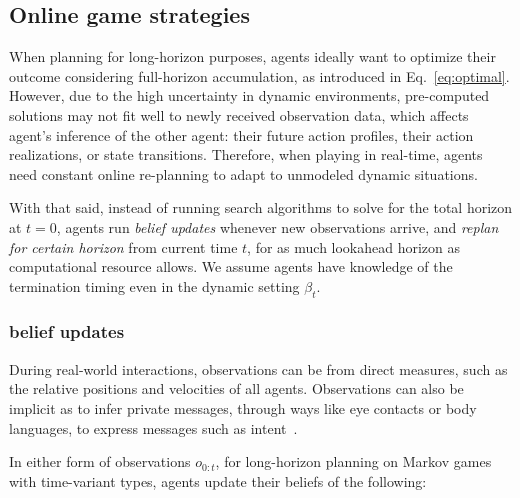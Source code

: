 \documentclass[letterpaper, 10 pt, conference]{ieeeconf}  %
\newcommand{\argmax}{\arg\!\!\max}
\begin{document}
\subsection{Online game strategies}
\vspace{-.2em}
When planning for long-horizon purposes, agents ideally 
want to optimize their outcome considering full-horizon accumulation, as introduced in 
Eq.~\ref{eq:optimal}. However, due to the high uncertainty in dynamic 
environments, pre-computed solutions may not fit well to newly received 
observation data, which affects agent's inference of the other 
agent: their future action profiles, their action realizations, or state transitions. Therefore, when 
playing in real-time, agents need constant online re-planning to adapt 
to unmodeled dynamic situations. 

With that said, instead of running search algorithms to solve for the total 
horizon at $t=0$, agents run \textit{belief updates} whenever new 
observations arrive, and 
\textit{replan for certain horizon} from current time $t$, for as much 
lookahead horizon as computational resource allows. 
We assume agents have knowledge of the termination timing even in the dynamic setting $\beta_t$. 
\subsubsection{belief updates}\label{sec:belief_update}
During real-world interactions, observations can be from direct measures, such as 
the relative positions and velocities of all agents. Observations can also 
be implicit as to infer private messages, through ways like eye contacts or body 
languages, to express messages such as intent~\cite{knepper2017implicit}.

In either form of observations $o_{0:t}$, for long-horizon planning on 
Markov games with time-variant types, agents 
update their beliefs of the following:
\end{document}
